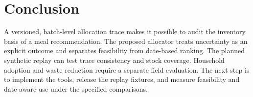 \section{Conclusion}
A versioned, batch-level allocation trace makes it possible to audit the inventory basis of a meal recommendation. The proposed allocator treats uncertainty as an explicit outcome and separates feasibility from date-based ranking. The planned synthetic replay can test trace consistency and stock coverage. Household adoption and waste reduction require a separate field evaluation. The next step is to implement the tools, release the replay fixtures, and measure feasibility and date-aware use under the specified comparisons.
